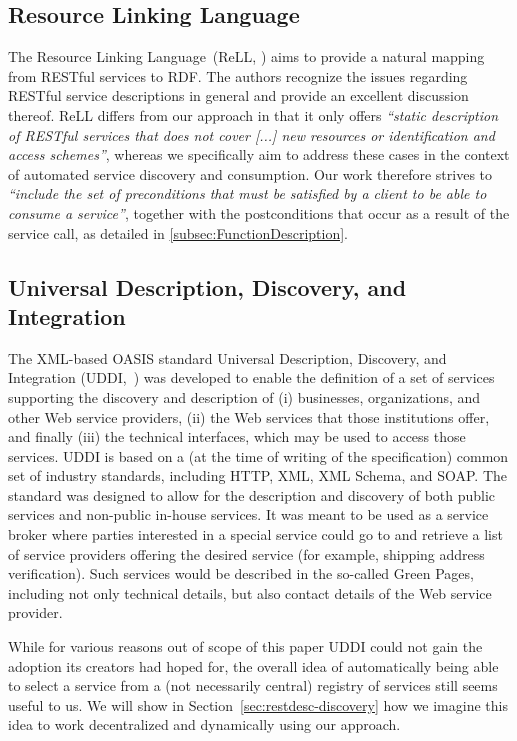 \documentclass[runningheads,a4paper, twocolumn]{llncs}
\begin{document}
\subsection{Resource Linking Language}
The Resource Linking Language~(ReLL, \cite{Alarcon:2010p5515}) aims to provide a natural mapping from RESTful services to RDF. The authors recognize the issues regarding RESTful service descriptions in general and provide an excellent discussion thereof. ReLL differs from our approach in that it only offers \emph{``static description of RESTful services that does not cover [...] new resources or identification and access schemes''}, whereas we specifically aim to address these cases in the context of automated service discovery and consumption. Our work therefore strives to \emph{``include the set of preconditions that must be satisfied by a client to be able to consume a service''}, together with the postconditions that occur as a result of the service call, as detailed in \autoref{subsec:FunctionDescription}.

\subsection{Universal Description, Discovery, and Integration} \label{sec:uddi}
The XML-based OASIS standard Universal Description, Discovery, and Integration (UDDI,~\cite{UDDI}) was developed to enable the definition of a set of services supporting the discovery and description of (i) businesses, organizations, and other Web service providers, (ii) the Web services that those institutions offer, and finally (iii) the technical interfaces, which may be used to access those services. UDDI is based on a (at the time of writing of the specification) common set of industry standards, including HTTP, XML, XML Schema, and SOAP. The standard was designed to allow for the description and discovery of both public services and non-public in-house services. It was meant to be used as a service broker where parties interested in a special service could go to and retrieve a list of service providers offering the desired service (for example, shipping address verification). Such services would be described in the so-called Green Pages, including not only technical details, but also contact details of the Web service provider.

While for various reasons out of scope of this paper UDDI could not gain the adoption its creators had hoped for, the overall idea of automatically being able to select a service from a (not necessarily central) registry of services still seems useful to us. We will show in Section~\ref{sec:restdesc-discovery} how we imagine this idea to work decentralized and dynamically using our approach.
\end{document}

